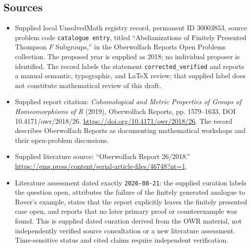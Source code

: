 \documentclass[11pt]{article}
\begin{document}
\subsection{Sources}
\begin{itemize}
\item Supplied local UnsolvedMath registry record, permanent ID \(30003853\), source problem code \texttt{catalogue entry}, titled ``Abelianizations of Finitely Presented Thompson \(F\) Subgroups,'' in the Oberwolfach Reports Open Problems collection. The proposed year is supplied as 2018; no individual proposer is identified. The record labels the statement \texttt{corrected\_verified} and reports a manual semantic, typographic, and LaTeX review; that supplied label does not constitute mathematical review of this draft.
\item Supplied report citation: \emph{Cohomological and Metric Properties of Groups of Homeomorphisms of R} (2019), Oberwolfach Reports, pp. 1579--1633, DOI 10.4171/owr/2018/26. \url{https://doi.org/10.4171/owr/2018/26}. The record describes Oberwolfach Reports as documenting mathematical workshops and their open-problem discussions.
\item Supplied literature source: ``Oberwolfach Report 26/2018.'' \url{https://ems.press/content/serial-article-files/46748?nt=1}.
\item Literature assessment dated exactly \texttt{2026-08-21}: the supplied curation labels the question open, attributes the failure of the finitely generated analogue to Rover's example, states that the report explicitly leaves the finitely presented case open, and reports that no later primary proof or counterexample was found. This is supplied dated curation derived from the OWR material, not independently verified source consultation or a new literature assessment. Time-sensitive status and cited claims require independent verification.
\end{itemize}
\end{document}
